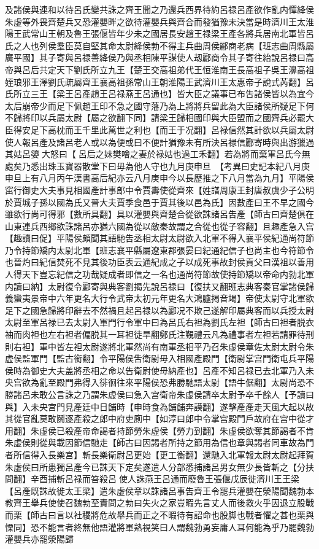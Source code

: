 及諸侯與連和以待呂氏變共誅之齊王聞之乃還兵西界待約呂禄呂產欲作亂内憚絳侯朱虚等外畏齊楚兵又恐灌嬰畔之欲待灌嬰兵與齊合而發猶豫未決當是時濟川王太淮陽王武常山王朝及魯王張偃皆年少未之國居長安趙王禄梁王產各將兵居南北軍皆呂氏之人也列侯羣臣莫自堅其命太尉絳侯勃不得主兵曲周侯酈商老病【班志曲周縣屬廣平國】其子寄與呂禄善絳侯乃與丞相陳平謀使人刼酈商令其子寄往紿說呂禄曰高帝與呂后共定天下劉氏所立九王【楚王交高祖弟代王恒淮南王長高祖子吳王濞高祖姪琅邪王澤劉氏疏屬齊王襄高祖孫常山王朝淮陽王武濟川王太惠帝子說式芮翻】呂氏所立三王【梁王呂產趙王呂禄燕王呂通也】皆大臣之議事已布吿諸侯皆以為宜今太后崩帝少而足下佩趙王印不急之國守藩乃為上將將兵留此為大臣諸侯所疑足下何不歸將印以兵屬太尉【屬之欲翻下同】請梁王歸相國印與大臣盟而之國齊兵必罷大臣得安足下高枕而王千里此萬世之利也【而王于况翻】呂禄信然其計欲以兵屬太尉使人報呂產及諸呂老人或以為便或曰不便計猶豫未有所決呂禄信酈寄時與出游獵過其姑呂嬃大怒曰【呂后之妹樊噲之妻於禄姑也過工禾翻】若為將而棄軍呂氏今無處矣乃悉出珠玉寶器散堂下曰毋為他人守也九月庚申旦　【考異曰史記本紀八月庚申旦上有八月丙午漢書高后紀亦云八月庚申今以長歷推之下八月當為九月】平陽侯窋行御史大夫事見相國產計事郎中令賈夀使從齊來【姓譜周康王封唐叔虞少子公明於賈城子孫以國為氏又晉大夫賈季食邑于賈其後以邑為氏】因數產曰王不早之國今雖欲行尚可得邪【數所具翻】具以灌嬰與齊楚合從欲誅諸呂吿產【師古曰齊楚俱在山東連兵西鄉欲誅諸呂亦猶六國為從以敵秦故謂之合從也從子容翻】且趣產急入宫【趣讀曰促】平陽侯頗聞其語馳吿丞相太尉太尉欲入北軍不得入襄平侯紀通尚符節乃令持節矯内太尉北軍【班志襄平縣屬遼東郡張晏曰紀通紀信子也尚主也今符節令也晉灼曰紀信焚死不見其後功臣表云通紀成之子以成死事故封侯貢父曰漢祖以善用人得天下豈忘紀信之功哉疑成者即信之一名也通尚符節故使持節矯以帝命内勃北軍内讀曰納】太尉復令酈寄與典客劉揭先說呂禄曰【復扶又翻班志典客秦官掌諸侯歸義蠻夷景帝中六年更名大行令武帝太初元年更名大鴻臚掲音竭】帝使太尉守北軍欲足下之國急歸將印辭去不然禍且起呂禄以為酈况不欺己遂解印屬典客而以兵授太尉太尉至軍呂禄已去太尉入軍門行令軍中曰為呂氏右袒為劉氏左袒【師古曰袒者脱衣袖而肉袒也左右袒者偏脱其一耳袒徒旱翻鄭氏注覲禮云凡為禮事者左袒若請罪待刑則右袒】軍中皆左袒太尉遂將北軍然尚有南軍丞相平乃召朱虚侯章佐太尉太尉令朱虚侯監軍門【監古銜翻】令平陽侯吿衛尉毋入相國產殿門【衛尉掌宫門衛屯兵平陽侯時為御史大夫盖將丞相之命以告衛尉使毋納產也】呂產不知呂禄已去北軍乃入未央宫欲為亂至殿門弗得入徘徊往來平陽侯恐弗勝馳語太尉【語牛倨翻】太尉尚恐不勝諸呂未敢公言誅之乃謂朱虚侯曰急入宫衛帝朱虚侯請卒太尉予卒千餘人【予讀曰與】入未央宫門見產廷中日餔時【申時食為餔餔奔謨翻】遂擊產產走天風大起以故其從官亂莫敢鬬逐產殺之郎中府吏廁中【如淳曰郎中令掌宫殿門戶故府在宫中從才用翻】朱虚侯已殺產帝命謁者持節勞朱虛侯【勞力到翻】朱虚侯欲奪其節謁者不肯朱虚侯則從與載因節信馳走【師古曰因謁者所持之節用為信也章與謁者同車故為門者所信得入長樂宫】斬長樂衛尉呂更始【更工衡翻】還馳入北軍報太尉太尉起拜賀朱虚侯曰所患獨呂產今已誅天下定矣遂遣人分部悉捕諸呂男女無少長皆斬之【分扶問翻】辛酉捕斬呂禄而笞殺呂使人誅燕王呂通而廢魯王張偃戊辰徙濟川王王梁【呂產既誅故徙太王梁】遣朱虚侯章以誅諸呂事吿齊王令罷兵灌嬰在滎陽聞魏勃本教齊王舉兵使使召魏勃至責問之勃曰失火之家豈暇先言丈人而後救火乎因退立股戰而栗【師古曰言以社稷將危故舉兵而正之不暇待有詔命也股脚也戰者懼之甚也栗與慄同】恐不能言者終無他語灌將軍熟視笑曰人謂魏勃勇妄庸人耳何能為乎乃罷魏勃灌嬰兵亦罷滎陽歸

